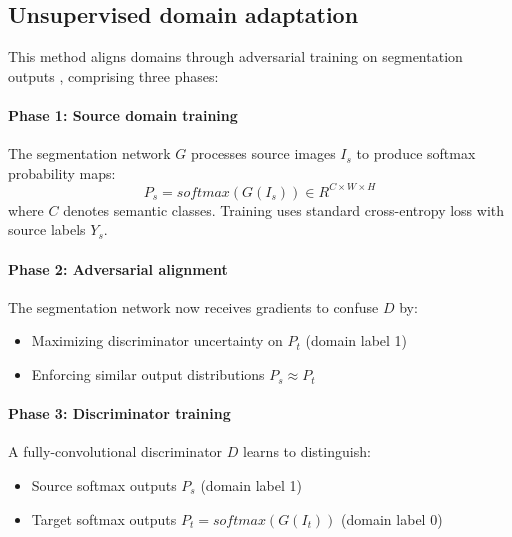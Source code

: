 \documentclass{article}
\begin{document}
\begin{multicols}{2}
\subsection{Unsupervised domain adaptation}  
 
This method aligns domains through adversarial training on segmentation outputs \cite{tsai2018learning}, comprising three phases:  

\paragraph{Phase 1: Source domain training}  
The segmentation network $G$ processes source images $I_s$ to produce softmax probability maps:  
\begin{equation}  
	P_s = {softmax}(G(I_s)) \in {R}^{C \times W \times H}  
\end{equation}  
where $C$ denotes semantic classes. Training uses standard cross-entropy loss with source labels $Y_s$.  



\paragraph{Phase 2: Adversarial alignment}  
The segmentation network now receives gradients to confuse $D$ by:  
\begin{itemize}  
	\item Maximizing discriminator uncertainty on $P_t$ (domain label 1)
	\item Enforcing similar output distributions $P_s \approx P_t$  

\end{itemize}  

\paragraph{Phase 3: Discriminator training}  
A fully-convolutional discriminator $D$ learns to distinguish:  
\begin{itemize}  
	\item Source softmax outputs $P_s$ (domain label 1)  
	\item Target softmax outputs $P_t = {softmax}(G(I_t))$ (domain label 0)  
\end{itemize}  



\end{multicols}
\end{document}
